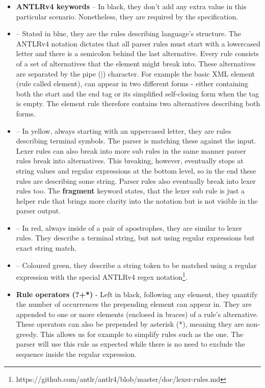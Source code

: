 \begin{itemize}
	\item \textbf{ANTLRv4 keywords} -- In black, they don't add any extra value in this particular scenario. Nonetheless, they are required by the specification.

	\item {} -- Stated in blue, they are the rules describing language's structure. The ANTLRv4 notation dictates that all parser rules must start with a lowercased letter and there is a semicolon behind the last alternative. Every rule consists of a set of alternatives that the element might break into. These alternatives are separated by the pipe ($|$) character. For example the basic XML element (rule called element), can appear in two different forms - either containing both the start and the end tag or its simplified self-closing form when the tag is empty. The element rule therefore contains two alternatives describing both forms.

	\item {} -- In yellow, always starting with an uppercased letter, they are rules describing terminal symbols. The parser is matching these against the input. Lexer rules can also break into more sub rules in the same manner parser rules break into alternatives. This breaking, however, eventually stops at string values and regular expressions at the bottom level, so in the end these rules are describing some string. Parser rules also eventually break into lexer rules too. The \textbf{fragment} keyword states, that the lexer sub rule is just a helper rule that brings more clarity into the notation but is not visible in the parser output.

	\item {} -- In red, always inside of a pair of apostrophes, they are similar to lexer rules. They describe a terminal string, but not using regular expressions but exact string match.

	\item {} -- Coloured green, they describe a string token to be matched using a regular expression with the special ANTLRv4 regex notation\footnote{https://github.com/antlr/antlr4/blob/master/doc/lexer-rules.md}.

	\item \textbf{Rule operators (?+*)} - Left in black, following any element, they quantify the number of occurrences the prepending element can appear in. They are appended to one or more elements (enclosed in braces) of a rule's alternative. These operators can also be prepended by asterisk (*), meaning they are non-greedy. This allows us for example to simplify rules such as the  one. The parser will use this rule as expected while there is no need to exclude the \literal{\texttt{]]>}} sequence inside the regular expression.
\end{itemize}